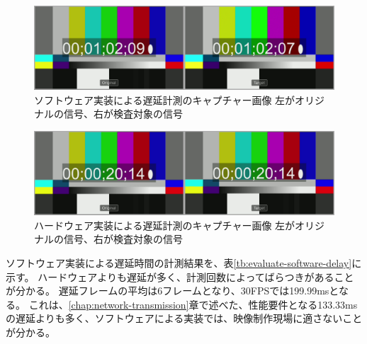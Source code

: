 \begin{figure}[htbp]
  \begin{center}
    \includegraphics[bb=0 0 1920 540,width=14cm]{img/evaluate-delay-software-2.png}
  \end{center}
  \caption[ソフトウェア実装による遅延計測のキャプチャー画像]{ソフトウェア実装による遅延計測のキャプチャー画像 左がオリジナルの信号、右が検査対象の信号}
  \label{fig:evaluate-delay-software-2}
\end{figure}

\begin{figure}[htbp]
  \begin{center}
    \includegraphics[bb=0 0 1920 540,width=14cm]{img/evaluate-delay-hardware.png}
  \end{center}
  \caption[ハードウェア実装による遅延計測のキャプチャー画像]{ハードウェア実装による遅延計測のキャプチャー画像 左がオリジナルの信号、右が検査対象の信号}
  \label{fig:evaluate-delay-hardware}
\end{figure}


ソフトウェア実装による遅延時間の計測結果を、表\ref{tb:evaluate-software-delay}に示す。
ハードウェアよりも遅延が多く、計測回数によってばらつきがあることが分かる。
遅延フレームの平均は6フレームとなり、30FPSでは199.99msとなる。
これは、\ref{chap:network-transmission}章で述べた、性能要件となる133.33msの遅延よりも多く、ソフトウェアによる実装では、映像制作現場に適さないことが分かる。

